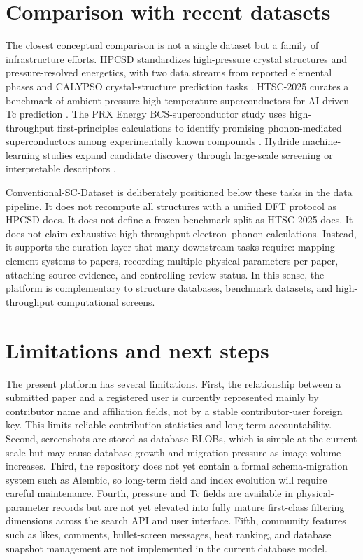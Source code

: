 \documentclass[11pt,a4paper]{article}
\begin{document}
\section{Comparison with recent datasets}

The closest conceptual comparison is not a single dataset but a family of infrastructure efforts. HPCSD standardizes high-pressure crystal structures and pressure-resolved energetics, with two data streams from reported elemental phases and CALYPSO crystal-structure prediction tasks \cite{wang2026hpcsd}. HTSC-2025 curates a benchmark of ambient-pressure high-temperature superconductors for AI-driven Tc prediction \cite{han2025htsc}. The PRX Energy BCS-superconductor study uses high-throughput first-principles calculations to identify promising phonon-mediated superconductors among experimentally known compounds \cite{bercx2025prxenergy}. Hydride machine-learning studies expand candidate discovery through large-scale screening or interpretable descriptors \cite{pires2026ambient,chen2026descriptors}.

Conventional-SC-Dataset is deliberately positioned below these tasks in the data pipeline. It does not recompute all structures with a unified DFT protocol as HPCSD does. It does not define a frozen benchmark split as HTSC-2025 does. It does not claim exhaustive high-throughput electron--phonon calculations. Instead, it supports the curation layer that many downstream tasks require: mapping element systems to papers, recording multiple physical parameters per paper, attaching source evidence, and controlling review status. In this sense, the platform is complementary to structure databases, benchmark datasets, and high-throughput computational screens.

\section{Limitations and next steps}

The present platform has several limitations. First, the relationship between a submitted paper and a registered user is currently represented mainly by contributor name and affiliation fields, not by a stable contributor-user foreign key. This limits reliable contribution statistics and long-term accountability. Second, screenshots are stored as database BLOBs, which is simple at the current scale but may cause database growth and migration pressure as image volume increases. Third, the repository does not yet contain a formal schema-migration system such as Alembic, so long-term field and index evolution will require careful maintenance. Fourth, pressure and Tc fields are available in physical-parameter records but are not yet elevated into fully mature first-class filtering dimensions across the search API and user interface. Fifth, community features such as likes, comments, bullet-screen messages, heat ranking, and database snapshot management are not implemented in the current database model.
\end{document}
